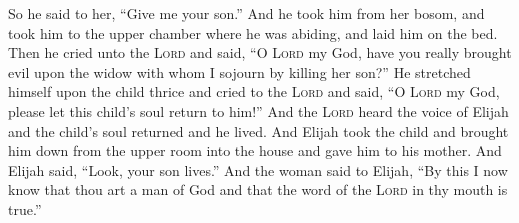 \begin{enumerate}[align=center]
     So he said to her, ``Give me your son.'' And he took him from her bosom, and took him to the upper chamber where he was abiding, and laid him on the bed.%
     Then he cried unto the \textsc{Lord} and said, ``O \textsc{Lord} my God, have you really brought evil upon the widow with whom I sojourn by killing her son?''%
     He stretched himself upon the child thrice and cried to the \textsc{Lord} and said, ``O \textsc{Lord} my God, please let this child's soul return to him!''%
     And the \textsc{Lord} heard the voice of Elijah and the child's soul returned and he lived.%
     And Elijah took the child and brought him down from the upper room into the house and gave him to his mother. And Elijah said, ``Look, your son lives.''%
     And the woman said to Elijah, ``By this I now know that thou art a man of God and that the word of the \textsc{Lord} in thy mouth is true.''%
\end{enumerate}
